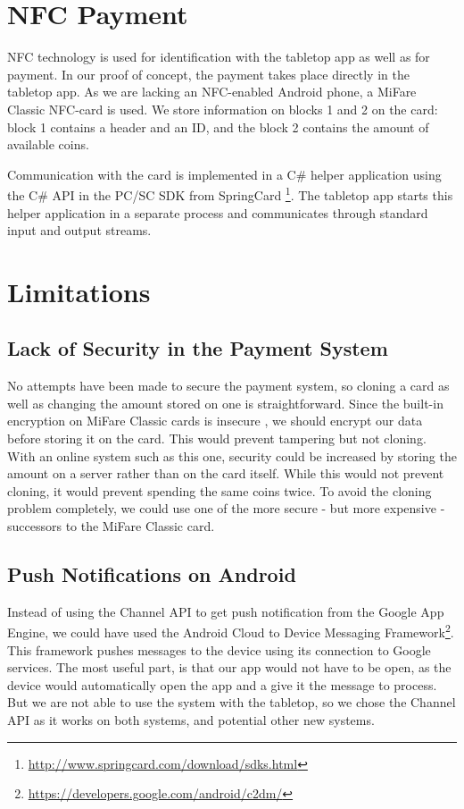 \documentclass{article}
\begin{document}
\section{NFC Payment}
NFC technology is used for identification with the tabletop app as well as for payment. In our proof of concept, the payment takes place directly in the tabletop app. As we are lacking an NFC-enabled Android phone, a MiFare Classic NFC-card is used. We store information on blocks 1 and 2 on the card: block 1 contains a header and an ID, and the block 2 contains the amount of available coins.
 
Communication with the card is implemented in a C\# helper application using the C\# API in the PC/SC SDK from SpringCard \footnote{\url{http://www.springcard.com/download/sdks.html}}. The tabletop app starts this helper application in a separate process and communicates through standard input and output streams.
 
\section{Limitations}
 
\subsection{Lack of Security in the Payment System}
No attempts have been made to secure the payment system, so cloning a card as well as changing the amount stored on one is straightforward. Since the built-in encryption on MiFare Classic cards is insecure \cite{darkSide}, we should encrypt our data before storing it on the card. This would prevent tampering but not cloning. With an online system such as this one, security could be increased by storing the amount on a server rather than on the card itself. While this would not prevent cloning, it would prevent spending the same coins twice. To avoid the cloning problem completely, we could use one of the more secure - but more expensive - successors to the MiFare Classic card.
 
\subsection{Push Notifications on Android}
Instead of using the Channel API to get push notification from the Google App Engine, we could have used the Android Cloud to Device Messaging Framework\footnote{\url{https://developers.google.com/android/c2dm/}}. This framework pushes messages to the device using its connection to Google services. The most useful part, is that our app would not have to be open, as the device would automatically open the app and a give it the message to process. But we are not able to use the system with the tabletop, so we chose the Channel API as it works on both systems, and potential other new systems.
 
\end{document}
